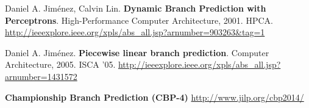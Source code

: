 \documentclass[paper=letter, fontsize=12pt]{article}
\begin{document}
\clearpage
\begin{thebibliography}{99}

Daniel A. Jiménez, Calvin Lin. \textbf{Dynamic Branch Prediction with Perceptrons}. High-Performance Computer Architecture, 2001. HPCA.
\url{http://ieeexplore.ieee.org/xpls/abs_all.jsp?arnumber=903263&tag=1}

Daniel A. Jiménez. \textbf{Piecewise linear branch prediction}. Computer Architecture, 2005. ISCA '05.
\url{http://ieeexplore.ieee.org/xpls/abs_all.jsp?arnumber=1431572}

\textbf{Championship Branch Prediction (CBP-4)} \url{http://www.jilp.org/cbp2014/}

\end{thebibliography}
\end{document}
